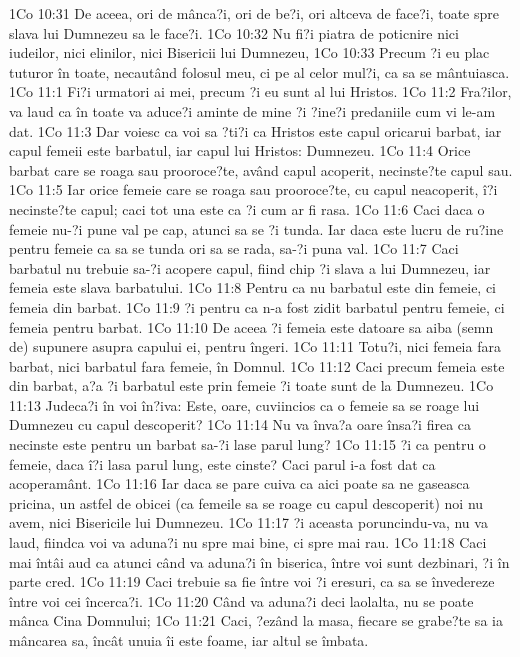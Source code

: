 1Co 10:31  De aceea, ori de mânca?i, ori de be?i, ori altceva de face?i, toate spre slava lui Dumnezeu sa le face?i.
1Co 10:32  Nu fi?i piatra de poticnire nici iudeilor, nici elinilor, nici Bisericii lui Dumnezeu,
1Co 10:33  Precum ?i eu plac tuturor în toate, necautând folosul meu, ci pe al celor mul?i, ca sa se mântuiasca.
1Co 11:1  Fi?i urmatori ai mei, precum ?i eu sunt al lui Hristos.
1Co 11:2  Fra?ilor, va laud ca în toate va aduce?i aminte de mine ?i ?ine?i predaniile cum vi le-am dat.
1Co 11:3  Dar voiesc ca voi sa ?ti?i ca Hristos este capul oricarui barbat, iar capul femeii este barbatul, iar capul lui Hristos: Dumnezeu.
1Co 11:4  Orice barbat care se roaga sau prooroce?te, având capul acoperit, necinste?te capul sau.
1Co 11:5  Iar orice femeie care se roaga sau prooroce?te, cu capul neacoperit, î?i necinste?te capul; caci tot una este ca ?i cum ar fi rasa.
1Co 11:6  Caci daca o femeie nu-?i pune val pe cap, atunci sa se ?i tunda. Iar daca este lucru de ru?ine pentru femeie ca sa se tunda ori sa se rada, sa-?i puna val.
1Co 11:7  Caci barbatul nu trebuie sa-?i acopere capul, fiind chip ?i slava a lui Dumnezeu, iar femeia este slava barbatului.
1Co 11:8  Pentru ca nu barbatul este din femeie, ci femeia din barbat.
1Co 11:9  ?i pentru ca n-a fost zidit barbatul pentru femeie, ci femeia pentru barbat.
1Co 11:10  De aceea ?i femeia este datoare sa aiba (semn de) supunere asupra capului ei, pentru îngeri.
1Co 11:11  Totu?i, nici femeia fara barbat, nici barbatul fara femeie, în Domnul.
1Co 11:12  Caci precum femeia este din barbat, a?a ?i barbatul este prin femeie ?i toate sunt de la Dumnezeu.
1Co 11:13  Judeca?i în voi în?iva: Este, oare, cuviincios ca o femeie sa se roage lui Dumnezeu cu capul descoperit?
1Co 11:14  Nu va înva?a oare însa?i firea ca necinste este pentru un barbat sa-?i lase parul lung?
1Co 11:15  ?i ca pentru o femeie, daca î?i lasa parul lung, este cinste? Caci parul i-a fost dat ca acoperamânt.
1Co 11:16  Iar daca se pare cuiva ca aici poate sa ne gaseasca pricina, un astfel de obicei (ca femeile sa se roage cu capul descoperit) noi nu avem, nici Bisericile lui Dumnezeu.
1Co 11:17  ?i aceasta poruncindu-va, nu va laud, fiindca voi va aduna?i nu spre mai bine, ci spre mai rau.
1Co 11:18  Caci mai întâi aud ca atunci când va aduna?i în biserica, între voi sunt dezbinari, ?i în parte cred.
1Co 11:19  Caci trebuie sa fie între voi ?i eresuri, ca sa se învedereze între voi cei încerca?i.
1Co 11:20  Când va aduna?i deci laolalta, nu se poate mânca Cina Domnului;
1Co 11:21  Caci, ?ezând la masa, fiecare se grabe?te sa ia mâncarea sa, încât unuia îi este foame, iar altul se îmbata.
